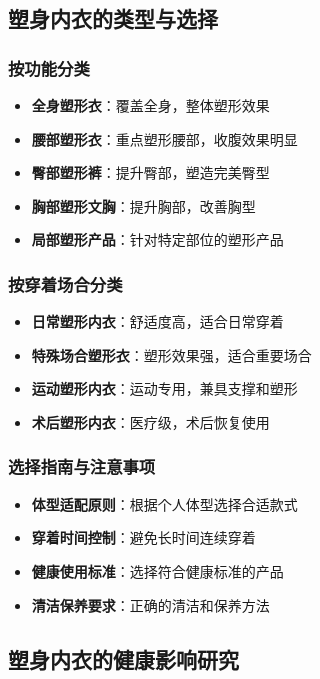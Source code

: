 \documentclass[12pt,UTF8]{ctexbook}
\begin{document}
\subsection{塑身内衣的类型与选择}
\subsubsection{按功能分类}
\begin{itemize}[leftmargin=2cm]
	\item \textbf{全身塑形衣}：覆盖全身，整体塑形效果
	\item \textbf{腰部塑形衣}：重点塑形腰部，收腹效果明显
	\item \textbf{臀部塑形裤}：提升臀部，塑造完美臀型
	\item \textbf{胸部塑形文胸}：提升胸部，改善胸型
	\item \textbf{局部塑形产品}：针对特定部位的塑形产品
\end{itemize}

\subsubsection{按穿着场合分类}
\begin{itemize}[leftmargin=2cm]
	\item \textbf{日常塑形内衣}：舒适度高，适合日常穿着
	\item \textbf{特殊场合塑形衣}：塑形效果强，适合重要场合
	\item \textbf{运动塑形内衣}：运动专用，兼具支撑和塑形
	\item \textbf{术后塑形内衣}：医疗级，术后恢复使用
\end{itemize}

\subsubsection{选择指南与注意事项}
\begin{itemize}[leftmargin=2cm]
	\item \textbf{体型适配原则}：根据个人体型选择合适款式
	\item \textbf{穿着时间控制}：避免长时间连续穿着
	\item \textbf{健康使用标准}：选择符合健康标准的产品
	\item \textbf{清洁保养要求}：正确的清洁和保养方法
\end{itemize}

\subsection{塑身内衣的健康影响研究}
\end{document}

